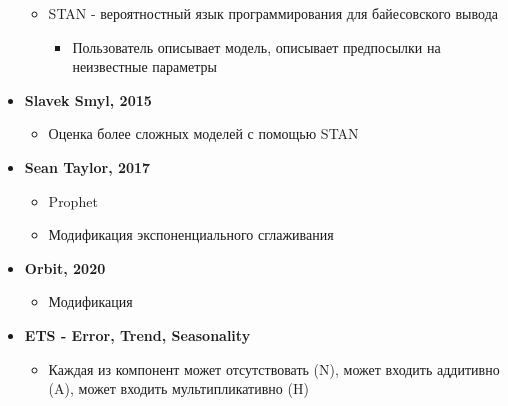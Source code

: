 \documentclass[a4paper, 12pt]{article}
\begin{document}
\begin{itemize}
\begin{itemize}
  \item
    
    STAN - вероятностный язык программирования для байесовского вывода
    

    \begin{itemize}
    \item
      
      Пользователь описывает модель, описывает предпосылки на
      неизвестные параметры
      
    \end{itemize}
  \end{itemize}
\item \textbf{Slavek Smyl, 2015}

  \begin{itemize}
  \item
    
    Оценка более сложных моделей с помощью STAN
    
  \end{itemize}
\item \textbf{Sean Taylor, 2017}

  \begin{itemize}
  \item
    
    Prophet
    
  \item
    
    Модификация экспоненциального сглаживания
    
  \end{itemize}
\item \textbf{Orbit, 2020}

  \begin{itemize}
  \item
    
    Модификация
    
  \end{itemize}
\item \textbf{ETS - Error, Trend, Seasonality}

  \begin{itemize}
  \item
    
    Каждая из компонент может отсутствовать (N), может входить аддитивно
    (A), может входить мультипликативно (H)
    

\end{itemize}
\end{itemize}
\end{document}
